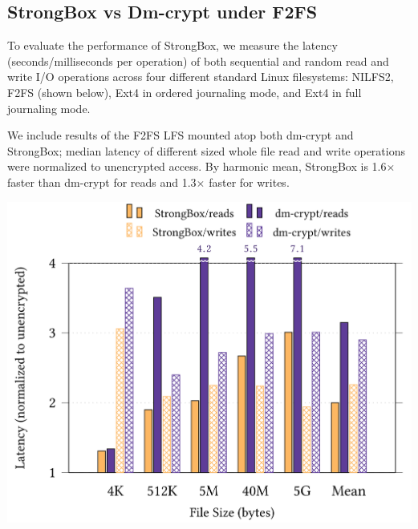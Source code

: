 \documentclass[a0,portrait]{a0poster}
\newcommand{\PAD}{\vskip 0.75cm}
\begin{document}
\begin{multicols}{2}

\section*{StrongBox vs Dm-crypt under F2FS}

To evaluate the performance of StrongBox, we measure the latency
(seconds/milliseconds per operation) of both sequential and random read and
write I/O operations across four different standard Linux filesystems: NILFS2,
F2FS (shown below), Ext4 in ordered journaling mode, and Ext4 in full journaling mode.

We include results of the F2FS LFS mounted atop both dm-crypt and StrongBox;
median latency of different sized whole file read and write operations were
normalized to unencrypted access. By harmonic mean, StrongBox is 1.6$\times$
faster than dm-crypt for reads and 1.3$\times$ faster for writes.

\begin{minipage}{\columnwidth}
\PAD 
\centering
\includegraphics[scale=0.45]{first_bars}
\label{fig:microbench-f2fs-sequential}
\PAD 
\end{minipage}\\[1ex]
\begin{minipage}{\columnwidth}
\PAD 
\end{minipage}


\end{multicols}
\end{document}
